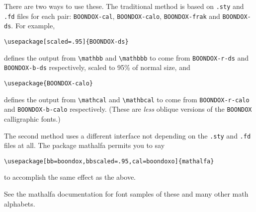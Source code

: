 \documentclass[11pt]{article}
\begin{document}
There are two ways to use these. The traditional method is based on  {\tt.sty} and {\tt.fd} files for each pair: {\tt BOONDOX-cal}, {\tt BOONDOX-calo}, {\tt BOONDOX-frak} and {\tt BOONDOX-ds}. For example,
\begin{verbatim}
\usepackage[scaled=.95]{BOONDOX-ds}
\end{verbatim}
defines the output from \verb|\mathbb| and \verb|\mathbbb| to come from {\tt BOONDOX-r-ds} and {\tt BOONDOX-b-ds} respectively, scaled to 95\% of normal size, and 
\begin{verbatim}
\usepackage{BOONDOX-calo}
\end{verbatim}
defines the output from \verb|\mathcal| and \verb|\mathbcal| to come from {\tt BOONDOX-r-calo} and {\tt BOONDOX-b-calo} respectively. (These are \emph{less} oblique versions of the {\tt BOONDOX} calligraphic fonts.)

The second method uses a different interface not depending on the {\tt.sty} and {\tt.fd} files at all. The package \textsf{mathalfa	} permits you to say
\begin{verbatim}
\usepackage[bb=boondox,bbscaled=.95,cal=boondoxo]{mathalfa}
\end{verbatim}
to accomplish the same effect as the above.

See the \textsf{mathalfa} documentation for font samples of these and many other math alphabets.
\end{document}
